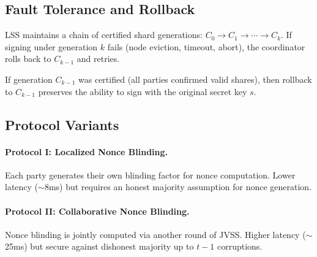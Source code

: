 \subsection{Fault Tolerance and Rollback}

\begin{definition}
LSS maintains a chain of certified shard generations: $C_0 \to C_1 \to \cdots \to C_k$. If signing under generation $k$ fails (node eviction, timeout, abort), the coordinator rolls back to $C_{k-1}$ and retries.
\end{definition}

\begin{theorem}
If generation $C_{k-1}$ was certified (all parties confirmed valid shares), then rollback to $C_{k-1}$ preserves the ability to sign with the original secret key $s$.
\end{theorem}

\subsection{Protocol Variants}

\paragraph{Protocol I: Localized Nonce Blinding.} Each party generates their own blinding factor for nonce computation. Lower latency ($\sim$8ms) but requires an honest majority assumption for nonce generation.

\paragraph{Protocol II: Collaborative Nonce Blinding.} Nonce blinding is jointly computed via another round of JVSS. Higher latency ($\sim$25ms) but secure against dishonest majority up to $t - 1$ corruptions.

